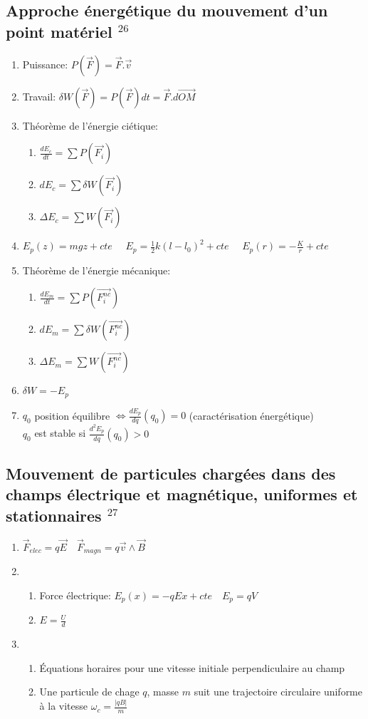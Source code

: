 \documentclass[fleqn]{article}
\theoremstyle{definition} \newtheorem*{defi}{D\'efinition}
\theoremstyle{definition} \newtheorem*{theo}{Th\'eor\`eme}
\theoremstyle{definition} \newtheorem*{coro}{Corollaire}
\theoremstyle{remark} \newtheorem*{rqs}{Remarques}
\theoremstyle{definition} \newtheorem*{prop}{Propri\'et\'e}
\begin{document}
\subsection{Approche \'energ\'etique du mouvement d'un point mat\'eriel $^{26}$}
\begin{enumerate}
	\item Puissance: $P(\vec{F}) = \vec{F}. \vec{v}$
	\item Travail: $\delta W(\vec{F}) = P(\vec{F})dt = \vec{F}.d\vec{OM}$
	\item Th\'eor\`eme de l'\'energie ci\'etique:
		\begin{enumerate}
			\item $\frac{dE_c}{dt} = \sum P(\vec{F_i})$
			\item $dE_c = \sum \delta W(\vec{F_i})$
			\item $\Delta E_c = \sum W(\vec{F_i})$
		\end{enumerate}
	\item
		$E_p(z) = mgz + cte \quad$
		$E_p = \frac{1}{2}k(l-l_0)^2 + cte \quad$
		$E_p(r) = -\frac{K}{r} + cte$
	\item Th\'eor\`eme de l'\'energie m\'ecanique:
		\begin{enumerate}
			\item $\frac{dE_m}{dt} = \sum P(\vec{F_i^{nc}})$
			\item $dE_m = \sum \delta W(\vec{F_i^{nc}})$
			\item $\Delta E_m = \sum W(\vec{F_i^{nc}})$
		\end{enumerate}
	\item $\delta W = -E_p$
	\item $q_0$ position \'equilibre $\Leftrightarrow \frac{dE_p}{dq}(q_0) = 0$ (caract\'erisation \'energ\'etique) \\
		$q_0$ est stable si $\frac{d^2E_p}{dq}(q_0) > 0$
\end{enumerate}

\subsection{Mouvement de particules charg\'ees dans des champs \'electrique et magn\'etique, uniformes et stationnaires $^{27}$}
\begin{enumerate}
	\item $\vec{F}_{elec} = q\vec{E}\quad \vec{F}_{magn} = q\vec{v} \land \vec{B}$
	\item \begin{enumerate} \item Force \'electrique: $E_p(x) = -qEx + cte\quad E_p = qV$
		\item $E = \frac{U}{d}$ \end{enumerate}
	\item \begin{enumerate} \item \'Equations horaires pour une vitesse initiale perpendiculaire au champ
		\item Une particule de chage $q$, masse $m$ suit une trajectoire circulaire uniforme \`a la vitesse $\omega_c = \frac{|qB|}{m}$
		\end{enumerate}
\end{enumerate}
\newpage
\end{document}
